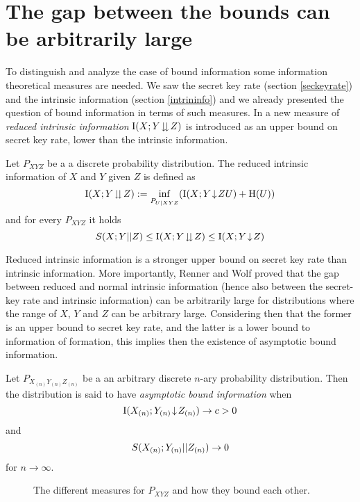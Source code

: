 \section{The gap between the bounds can be arbitrarily large}
    To distinguish and analyze the case of bound information some information theoretical measures are needed. 
    We saw the secret key rate (section \ref{seckeyrate}) and the intrinsic information (section \ref{intrininfo}) and we already presented the question of bound information in terms of such measures. 
    In \cite{RW03} a new measure of \emph{reduced intrinsic information} $\operatorname{I}(X;Y\!\downdownarrows\!Z)$ is introduced as an upper bound on secret key rate, lower than the intrinsic information. 
    \begin{definition}\cite{RW03}
    	Let $P_{XYZ}$ be a a discrete probability distribution. The reduced intrinsic information of $X$ and $Y$ given $Z$ is defined as
    	\begin{equation} \label{eq:reducedintrinfo}
    	\operatorname{I}(X;Y\!\downdownarrows\!Z) := \inf_{P_{U|XYZ}} (\operatorname{I}(X;Y\!\downarrow\!ZU) + \operatorname{H} (U))
    \end{equation}
    and for every $P_{XYZ}$ it holds
    \begin{equation} \label{eq:bounds}
    	S(X;Y||Z) \leq \operatorname{I}(X;Y\!\downdownarrows\!Z) \leq \operatorname{I}(X;Y\!\downarrow\!Z)
    \end{equation}
    \end{definition}
    	Reduced intrinsic information is a stronger upper bound on secret key rate than intrinsic information.
    	More importantly, Renner and Wolf proved that the gap between reduced and normal intrinsic information (hence also between the secret-key rate and intrinsic information) can be arbitrarily large for distributions where the range of $X$, $Y$ and $Z$ can be arbitrary large\cite{RW03}. 
    	Considering then that the former is an upper bound to secret key rate, and the latter is a lower bound to information of formation, this implies then the existence of asymptotic bound information.
    	\begin{definition}\cite{RW03}
    		Let $P_{X_{(n)}Y_{(n)}Z_{(n)}}$ be a an arbitrary discrete $n$-ary probability distribution. Then the distribution is said to have \emph{asymptotic bound information} when
    		\begin{equation}
    			\operatorname{I}(X_{(n)};Y_{(n)}\!\downarrow\!Z_{(n)}) \rightarrow c > 0
    		\end{equation}
    		and
    		\begin{equation}
    			S(X_{(n)};Y_{(n)}||Z_{(n)}) \rightarrow 0
    		\end{equation}
    		for $n\rightarrow \infty$.
    	\end{definition}
    	\begin{figure}
    		
    		\caption{The different measures for $P_{XYZ}$ and how they bound each other.}
    	\end{figure}
    	
